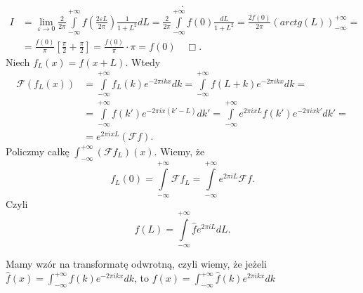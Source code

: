 \documentclass[../main.tex]{subfiles}
\begin{document}
\begin{enumerate}
\[.\]
\begin{align*}
    I &= \lim_{\varepsilon \to 0}\frac{2}{2\pi }\int\limits_{-\infty}^{+\infty}f\left( \frac{2\varepsilon L}{2\pi } \right) \frac{1}{1 + L^2}dL = \frac{2}{2\pi}\int\limits_{-\infty}^{+\infty}f(0)\frac{dL}{1+L^2} = \frac{2 f(0)}{2\pi }\left( arctg(L)\right)_{-\infty}^{+\infty} =\\
    &= \frac{f(0)}{\pi} \left[ \frac{\pi}{2} + \frac{\pi}{2} \right] = \frac{f(0)}{\pi} \cdot \pi = f(0)\quad \Box
.\end{align*}
Niech $f_L(x) = f(x+L)$. Wtedy
\begin{align*}
    \mathcal{F}\left( f_L(x) \right) &= \int\limits_{-\infty}^{+\infty}f_L(k) e^{-2\pi i k x}dk = \int\limits_{-\infty}^{+\infty}f(L+k)e^{-2\pi ikx}dk =\\
    &= \int\limits_{-\infty}^{+\infty}f(k') e^{-2\pi i x(k' - L)}dk' = \int\limits_{-\infty}^{+\infty}e^{2\pi ix L}f(k')e^{-2\pi ixk'}dk' =\\
    &= e^{2\pi ixL}\left( \mathcal{F}f \right)
.\end{align*}
Policzmy całkę $\int_{-\infty}^{+\infty}(\mathcal{F}f_L)(x)$. Wiemy, że
\[
    f_L(0) = \int\limits_{-\infty}^{+\infty}\mathcal{F}f_L = \int\limits_{-\infty}^{+\infty}e^{2\pi i L}\mathcal{F}f
.\]
Czyli
\[
    f(L) = \int\limits_{-\infty}^{+\infty}\hat{f}e^{2\pi i L}dL
.\]
\end{enumerate}
Mamy wzór na transformatę odwrotną, czyli wiemy, że jeżeli $\hat{f}(x) = \int_{-\infty}^{+\infty}f(k)e^{-2\pi i kx}dk$, to $f(x) = \int_{-\infty}^{+\infty}\hat{f}(k) e^{2\pi i kx}dk$
\end{document}
